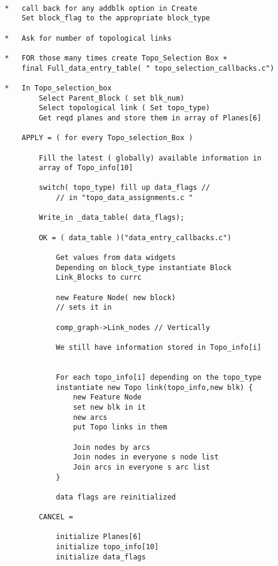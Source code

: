  
    \begin{verbatim}
 
    *   call back for any addblk option in Create
        Set block_flag to the appropriate block_type
 
    *   Ask for number of topological links
 
    *   FOR those many times create Topo_Selection Box +
        final Full_data_entry_table( " topo_selection_callbacks.c")
 
    *   In Topo_selection_box
            Select Parent_Block ( set blk_num)
            Select topological link ( Set topo_type)
            Get reqd planes and store them in array of Planes[6]
 
        APPLY = ( for every Topo_selection_Box )
 
            Fill the latest ( globally) available information in
            array of Topo_info[10]
 
            switch( topo_type) fill up data_flags //
                // in "topo_data_assignments.c "
 
            Write_in _data_table( data_flags);
 
            OK = ( data_table )("data_entry_callbacks.c")
 
                Get values from data widgets
                Depending on block_type instantiate Block
                Link_Blocks to currc
 
                new Feature Node( new block)
                // sets it in
 
                comp_graph->Link_nodes // Vertically
 
                We still have information stored in Topo_info[i]
 
 
                For each topo_info[i] depending on the topo_type
                instantiate new Topo link(topo_info,new blk) {
                    new Feature Node
                    set new blk in it
                    new arcs
                    put Topo links in them
 
                    Join nodes by arcs
                    Join nodes in everyone s node list
                    Join arcs in everyone s arc list
                }
 
                data flags are reinitialized
 
            CANCEL =
 
                initialize Planes[6]
                initialize topo_info[10]
                initialize data_flags
 
    \end{verbatim}

